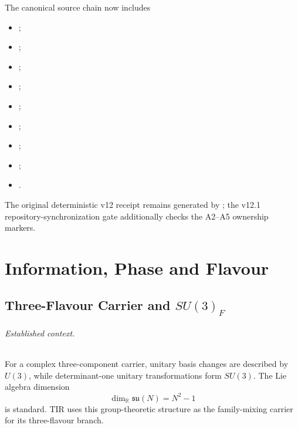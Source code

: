\documentclass[11pt,a4paper,twoside]{book}
\theoremstyle{definition}
\begin{document}
The canonical source chain now includes
\begin{itemize}
\item {};
\item {};
\item {};
\item {};
\item {};
\item {};
\item {};
\item {};
\item {}.
\end{itemize}
The original deterministic v12 receipt remains generated by
; the v12.1
repository-synchronization gate additionally checks the A2--A5 ownership
markers.

\clearpage





\part{Information, Phase and Flavour}

\chapter[Three-Flavour Carrier]{Three-Flavour Carrier and $SU(3)_F$}
\label{ch:v12_three_flavour_su3}

\paragraph{Established context.}
For a complex three-component carrier, unitary basis changes are described by
$U(3)$, while determinant-one unitary transformations form $SU(3)$.  The Lie
algebra dimension
\[
\dim_{\mathbb R}\mathfrak{su}(N)=N^2-1
\]
is standard.  TIR uses this group-theoretic structure as the family-mixing
carrier for its three-flavour branch.
\end{document}
